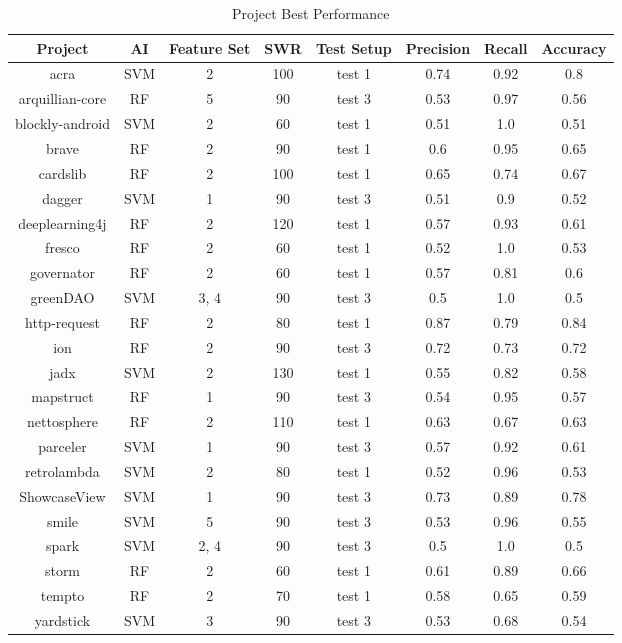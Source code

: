 \begin{table}
\begin{center}
    \begin{tabular}{|c|c|c|c|c|c|c|c|}
        \hline
        Project & AI & Feature Set & SWR & Test Setup & Precision & Recall & Accuracy \\
        \hline
        acra & SVM & 2 & 100 & test 1 & 0.74 & 0.92 & 0.8 \\
        arquillian-core & RF & 5 & 90 & test 3 & 0.53 & 0.97 & 0.56 \\
        blockly-android & SVM & 2 & 60 & test 1 & 0.51 & 1.0 & 0.51 \\
        brave & RF & 2 & 90 & test 1 & 0.6 & 0.95 & 0.65 \\
        cardslib & RF & 2 & 100 & test 1 & 0.65 & 0.74 & 0.67 \\
        dagger & SVM & 1 & 90 & test 3 & 0.51 & 0.9 & 0.52 \\
        deeplearning4j & RF & 2 & 120 & test 1 & 0.57 & 0.93 & 0.61 \\
        fresco & RF & 2 & 60 & test 1 & 0.52 & 1.0 & 0.53 \\
        governator & RF & 2 & 60 & test 1 & 0.57 & 0.81 & 0.6 \\
        greenDAO & SVM & 3, 4 & 90 & test 3 & 0.5 & 1.0 & 0.5 \\
        http-request & RF & 2 & 80 & test 1 & 0.87 & 0.79 & 0.84 \\
        ion & RF & 2 & 90 & test 3 & 0.72 & 0.73 & 0.72 \\
        jadx & SVM & 2 & 130 & test 1 & 0.55 & 0.82 & 0.58 \\
        mapstruct & RF & 1 & 90 & test 3 & 0.54 & 0.95 & 0.57 \\
        nettosphere & RF & 2 & 110 & test 1 & 0.63 & 0.67 & 0.63 \\
        parceler & SVM & 1 & 90 & test 3 & 0.57 & 0.92 & 0.61 \\
        retrolambda & SVM & 2 & 80 & test 1 & 0.52 & 0.96 & 0.53 \\
        ShowcaseView & SVM & 1 & 90 & test 3 & 0.73 & 0.89 & 0.78 \\
        smile & SVM & 5 & 90 & test 3 & 0.53 & 0.96 & 0.55 \\
        spark & SVM & 2, 4 & 90 & test 3 & 0.5 & 1.0 & 0.5 \\
        storm & RF & 2 & 60 & test 1 & 0.61 & 0.89 & 0.66 \\
        tempto & RF & 2 & 70 & test 1 & 0.58 & 0.65 & 0.59 \\
        yardstick & SVM & 3 & 90 & test 3 & 0.53 & 0.68 & 0.54 \\
        \hline
    \end{tabular}
\end{center}
\caption{Project Best Performance}
\label{tab:project_performance}
\end{table}

